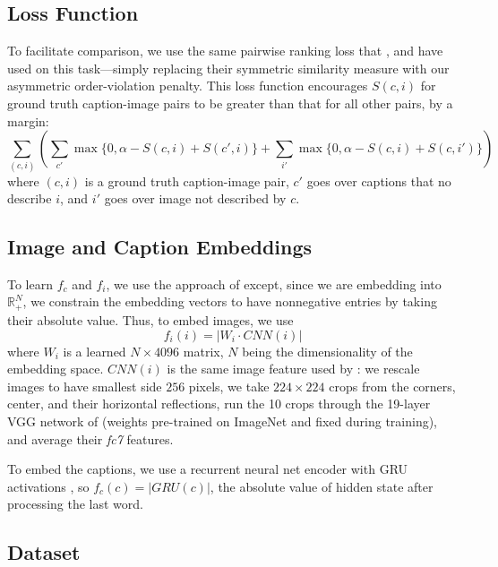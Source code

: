 \documentclass{article} \usepackage{iclr2016_conference,times}
\begin{document}
\subsection{Loss Function}
To facilitate comparison, we use the same pairwise ranking loss that \citet{socher2014grounded}, \citet{kiros2014} and \citet{karpathydeep} have used on this task---simply replacing their symmetric similarity measure with our asymmetric order-violation penalty. This loss function encourages $S(c,i)$ for ground truth caption-image pairs to be greater than that for all other pairs, by a margin:
\begin{equation} \sum_{(c, i)} \left( \sum_{c'} \max\{0, \alpha - S(c,i) + S(c', i)\}  + \sum_{i'} \max\{0, \alpha - S(c,i) + S(c, i')\} \right) \label{eq:contrastive} \end{equation}
where $(c,i)$ is a ground truth caption-image pair, $c'$ goes over captions that no describe $i$, and $i'$ goes over image not described by $c$.

\subsection{Image and Caption Embeddings}
To learn $f_c$ and $f_i$, we use the approach of \citet{kiros2014}  except, since we are embedding into $\mathbb{R}_{+}^N$, we constrain the embedding vectors to have nonnegative entries by taking their absolute value. Thus, to embed images, we use 
\begin{equation} 
f_i(i) = | W_i \cdot CNN(i) | 
\end{equation}
where $W_i$ is a learned $N\times 4096$ matrix, $N$ being the dimensionality of the embedding space. $CNN(i) $ is the same image feature used by \citet{klein2015fisher}: we rescale images to have smallest side $256$ pixels, we take $224\times 224$ crops from the corners, center, and their horizontal reflections, run the 10 crops through the 19-layer VGG network of \citet{vgg} (weights pre-trained on ImageNet and fixed during training), and average their \emph{fc7} features. 

To embed the captions, we use a recurrent neural net encoder with GRU activations \citep{gru}, so $f_c(c) = | GRU(c) |$, the absolute value of hidden state after processing the last word. 


\subsection{Dataset}
\end{document}
